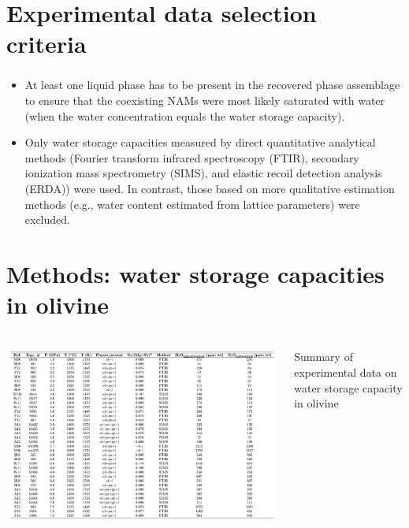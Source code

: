 \documentclass[aspectratio=1610]{beamer}
\begin{document}
\section{Experimental data selection criteria}
\begin{frame}
      \frametitle{\secname}
      \begin{itemize}
            \item At least one liquid phase has to be present in the recovered phase assemblage to
                  ensure that the coexisting NAMs were most likely saturated with water (when the water
                  concentration equals the water storage capacity).
            \item Only water storage capacities measured by direct quantitative analytical methods
                  (Fourier transform infrared spectroscopy (FTIR), secondary ionization mass spectrometry
                  (SIMS), and elastic recoil detection analysis (ERDA)) were used. In contrast, those based on
                  more qualitative estimation methods (e.g., water content estimated from lattice parameters)
                  were excluded.
      \end{itemize}
\end{frame}

\section{Methods: water storage capacities in olivine}
\begin{frame}
      \frametitle{\secname}
      \begin{columns}
            \centering
            \includegraphics[width=\textwidth]{tab1.png}
            \caption{Summary of experimental data on water storage capacity in olivine}

      \end{columns}
\end{frame}
\end{document}
